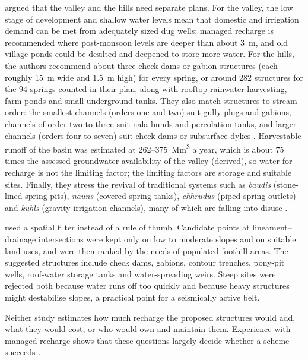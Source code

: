 \documentclass[10pt,a4paper,twocolumn]{article}
\newcommand{\Mm}{Mm\textsuperscript{3}}
\begin{document}
\citet{pophare2015} argued that the valley and the hills need separate plans. For the valley,
the low stage of development and shallow water levels mean that domestic and irrigation demand
can be met from adequately sized dug wells; managed recharge is recommended where
post-monsoon levels are deeper than about 3~m, and old village ponds could be desilted and
deepened to store more water. For the hills, the authors recommend about three check dams or
gabion structures (each roughly 15~m wide and 1.5~m high) for every spring, or around 282
structures for the 94 springs counted in their plan, along with rooftop rainwater harvesting, farm ponds and
small underground tanks. They also match structures to stream order: the smallest channels (orders one and two) suit
gully plugs and gabions, channels of order two to three suit nala bunds and percolation tanks,
and larger channels (orders four to seven) suit check dams or subsurface dykes
\citep{cgwb2007}. Harvestable runoff of the basin was estimated at 262--375~\Mm{} a year, which is
about 75 times the assessed groundwater availability of the valley (derived), so water
for recharge is not the limiting factor; the limiting factors are storage and suitable sites.
Finally, they stress the revival of traditional systems such as \textit{baudis} (stone-lined
spring pits), \textit{nauns} (covered spring tanks), \textit{chhrudus} (piped spring outlets) and
\textit{kuhls} (gravity irrigation channels), many of which are falling into disuse
\citep{sharma2009}.

\citet{sharma2025} used a spatial filter instead of a rule of thumb. Candidate points at
lineament--drainage intersections were kept only on low to moderate slopes and on suitable land
uses, and were then ranked by the needs of populated foothill areas. The suggested structures
include check dams, gabions, contour trenches, pony-pit wells, roof-water storage tanks and
water-spreading weirs.
Steep sites were rejected both because water runs off too quickly and because heavy structures
might destabilise slopes, a practical point for a seismically active belt.

Neither study estimates how much recharge the proposed structures would add, what they would
cost, or who would own and maintain them. Experience with managed recharge shows that these
questions largely decide whether a scheme succeeds \citep{bouwer2002}.
\end{document}
